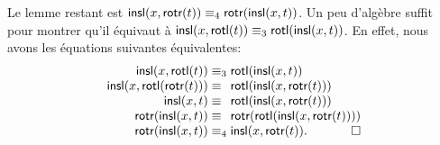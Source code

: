 Le lemme restant est \(\textsf{insl}(x,\textsf{rotr}(t)) \equiv_4
\textsf{rotr}(\textsf{insl}(x,t))\). Un peu d'algèbre suffit pour montrer
qu'il équivaut à \(\textsf{insl}(x,\textsf{rotl}(t)) \equiv_3
\textsf{rotl}(\textsf{insl}(x,t))\).  En effet, nous avons les équations
suivantes équivalentes:
\begin{equation*}
\begin{array}{@{}r@{\;}l@{\;}l@{}}
\fun{insl}(x,\fun{rotl}(t)) & \equiv_3 & \fun{rotl}(\fun{insl}(x,t))\\
\fun{insl}(x,\fun{rotl}(\fun{rotr}(t))) & \equiv &
\fun{rotl}(\fun{insl}(x,\fun{rotr}(t)))\\
\fun{insl}(x,t) & \equiv & \fun{rotl}(\fun{insl}(x,\fun{rotr}(t)))\\
\fun{rotr}(\fun{insl}(x,t)) & \equiv &
\fun{rotr}(\fun{rotl}(\fun{insl}(x,\fun{rotr}(t))))\\
\fun{rotr}(\fun{insl}(x,t)) & \equiv_4 &
\fun{insl}(x,\fun{rotr}(t)).\hfill\Box
\end{array}
\end{equation*}



